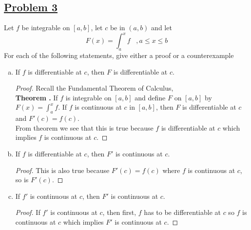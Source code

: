 \documentclass[10pt,letterpaper]{article}
\begin{document}
	\subsection*{{\color{purple}\underline{Problem 3}}}
	Let $f$ be integrable on $[a, b]$, let $c$ be in $(a, b)$ and let 
	$$F(x) = \displaystyle\int_a^x f \,\,\,\, \, ,a \leq x \leq b$$
	For each of the following statements, give either a proof or a counterexample
	\begin{enumerate}[(a)]
	\item If $f$ is differentiable at $c$, then $F$ is differentiable at $c$.
	\begin{proof}
	Recall the Fundamental Theorem of Calculus, \\
	\textbf{Theorem .} If $f$ is integrable on $[a, b]$ and define $F$ on $[a, b]$
	by $F(x) = \displaystyle\int_a^x f$. If $f$ is continuous at $c$ in $[a, b]$,
	then $F$ is differentiable at $c$ and $F'(c) = f(c)$. \\
	
	From theorem we see that this is true because $f$ is differentiable at $c$ which implies
	$f$ is continuous at $c$.
	\end{proof}
	
	\item If $f$ is differentiable at $c$, then $F'$ is continuous at $c$.
	\begin{proof}
	This is also true because $F'(c) = f(c)$ where $f$ is continuous at $c$, so is
	$F'(c)$.
	\end{proof}		
	
	\item If $f'$ is continuous at $c$, then $F'$ is continuous at $c$.
	\begin{proof}
	If $f'$ is continuous at $c$, then first, $f$ has to be differentiable at $c$
	so $f$ is continuous at $c$ which implies $F'$ is continuous at $c$.	
	\end{proof}
	
	
	\end{enumerate}
	
\end{document}
